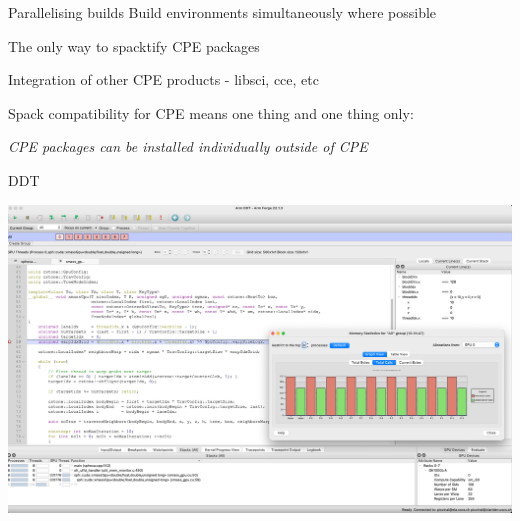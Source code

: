 \documentclass[aspectratio=43]{beamer}
\begin{document}


\begin{frame}[fragile]{Parallelising builds}
    Build environments simultaneously where possible
    \begin{center}
        
    \end{center}
\end{frame}

\begin{frame}[fragile]{The only way to spacktify CPE packages}
    \begin{center}
    Integration of other CPE products - libsci, cce, etc

    \vspace{20pt}

    Spack compatibility for CPE means one thing and one thing only:

    \vspace{20pt}

    \emph{CPE packages can be installed individually outside of CPE}

    \end{center}
\end{frame}
\begin{frame}[fragile]{DDT}
    \begin{center}
        \includegraphics[width=\textwidth]{images/sph-ddt-uenv.png}
    \end{center}
\end{frame}
\end{document}

